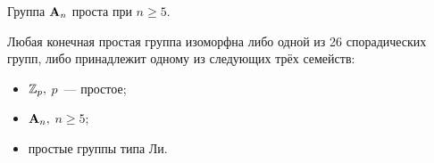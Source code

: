          \begin{theorem}
             Группа $\mathbf{A}_n$ проста при ${n \geqslant 5.}$
         \end{theorem}
         \begin{theorem*}
             Любая конечная простая группа изоморфна либо одной из 26 спорадических групп, либо принадлежит одному из следующих трёх семейств:
             \begin{itemize}
             \setlength\itemsep{0.1em}
                 \item ${\mathbb{Z}_p,}$ $p$~--- простое;
                 \item ${\mathbf{A}_n,}$ ${n \geqslant 5;}$
                 \item простые группы типа Ли.
             \end{itemize}
         \end{theorem*}